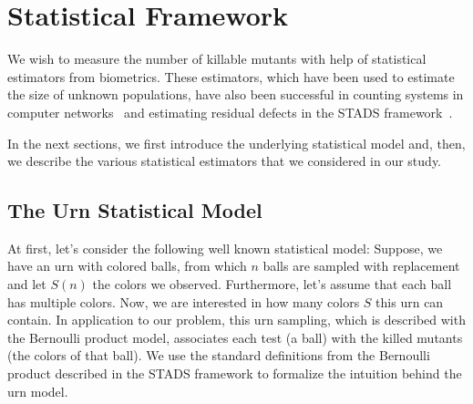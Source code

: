 \documentclass[sigconf,review,anonymous]{acmart}
\newcounter{todocounter}
\newcommand{\todo}[1]{\marginpar{$|$}\textcolor{red}{\stepcounter{todocounter}\footnote[\thetodocounter]{\textcolor{red}{\textbf{TODO }}\textit{#1}}}}
\newcommand{\Evosuite}{\textsc{EvoSuite}\xspace}
\newcommand{\original}{\textsc{Original}\xspace}
\newcommand{\EvosuiteRandom}{\textsc{Random}\xspace}
\newcommand{\EvosuiteDynamosa}{\textsc{DynaMOSA}\xspace}
\renewcommand{\todo}[1]{}
\begin{document}


\section{Statistical Framework}
\label{sec:mapping}
We wish to measure the number of killable mutants with help of statistical estimators from biometrics.
These estimators, which have been used to estimate the size of unknown populations, 
have also been successful in counting systems in
computer networks~\cite{accettura2015the} and
estimating residual defects in the STADS framework~\cite{bohme2018stads}.

In the next sections, we first introduce the underlying statistical model and, then,
we describe the various statistical estimators that we considered in our study.

\subsection{The Urn Statistical Model}
At first, let's consider the following well known statistical model:
Suppose, we have an urn with colored balls, from which $n$ balls are
sampled with replacement and let $S(n)$ the colors we observed.
%
Furthermore, let's assume that each ball has multiple colors.
Now, we are interested in how many colors $S$ this urn can contain.
In application to our problem, this urn sampling, which is described with the Bernoulli product model, associates each test (a ball) with the killed mutants (the colors of that ball). %
%
We use the standard definitions from the Bernoulli product described in the STADS framework
to formalize the intuition behind the urn model.
\end{document}
